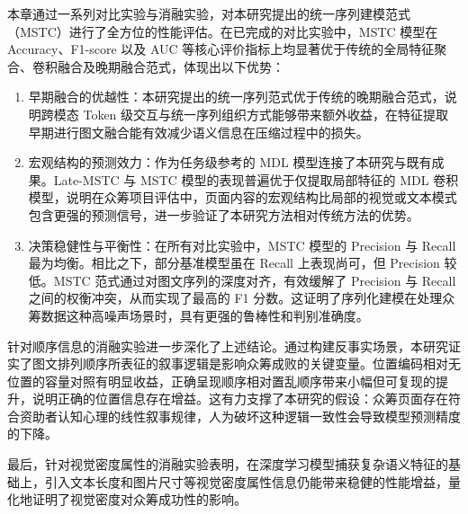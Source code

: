 本章通过一系列对比实验与消融实验，对本研究提出的统一序列建模范式（MSTC）进行了全方位的性能评估。在已完成的对比实验中，MSTC 模型在 Accuracy、F1-score 以及 AUC 等核心评价指标上均显著优于传统的全局特征聚合、卷积融合及晚期融合范式，体现出以下优势：

\begin{enumerate}
\def\labelenumi{(\arabic{enumi})}
\item
  早期融合的优越性：本研究提出的统一序列范式优于传统的晚期融合范式，说明跨模态 Token 级交互与统一序列组织方式能够带来额外收益，在特征提取早期进行图文融合能有效减少语义信息在压缩过程中的损失。
\item
  宏观结构的预测效力：作为任务级参考的 MDL 模型连接了本研究与既有成果。Late-MSTC 与 MSTC 模型的表现普遍优于仅提取局部特征的 MDL 卷积模型，说明在众筹项目评估中，页面内容的宏观结构比局部的视觉或文本模式包含更强的预测信号，进一步验证了本研究方法相对传统方法的优势。
\item
  决策稳健性与平衡性：在所有对比实验中，MSTC 模型的 Precision 与 Recall 最为均衡。相比之下，部分基准模型虽在 Recall 上表现尚可，但 Precision 较低。MSTC 范式通过对图文序列的深度对齐，有效缓解了 Precision 与 Recall 之间的权衡冲突，从而实现了最高的 F1 分数。这证明了序列化建模在处理众筹数据这种高噪声场景时，具有更强的鲁棒性和判别准确度。
\end{enumerate}

针对顺序信息的消融实验进一步深化了上述结论。通过构建反事实场景，本研究证实了图文排列顺序所表征的叙事逻辑是影响众筹成败的关键变量。位置编码相对无位置的容量对照有明显收益，正确呈现顺序相对置乱顺序带来小幅但可复现的提升，说明正确的位置信息存在增益。这有力支撑了本研究的假设：众筹页面存在符合资助者认知心理的线性叙事规律，人为破坏这种逻辑一致性会导致模型预测精度的下降。

最后，针对视觉密度属性的消融实验表明，在深度学习模型捕获复杂语义特征的基础上，引入文本长度和图片尺寸等视觉密度属性信息仍能带来稳健的性能增益，量化地证明了视觉密度对众筹成功性的影响。
